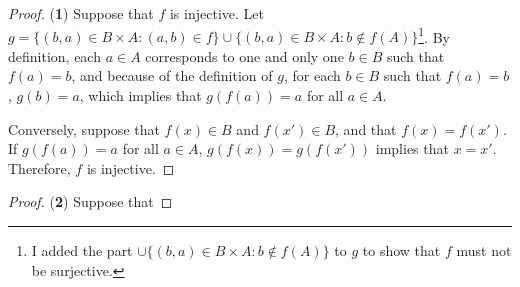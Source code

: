 \begin{proof}(\textbf{1})
	Suppose that $f$ is injective. Let $g = \{(b,a)\in B\times A:(a,b)\in f\}\cup\{(b,a)\in B\times A:b\notin f(A)\}$\footnote{I added the part $\cup\{(b,a)\in B\times A:b\notin f(A)\}$ to $g$ to show that $f$ must not be surjective.}. By definition, each $a\in A$ corresponds to one and only one $b\in B$ such that $f(a)=b$, and because of the definition of $g$, for each $b\in B$ such that $f(a)=b$, $g(b)=a$, which implies that $g(f(a))=a$ for all $a\in A$. 
	
	Conversely, suppose that $f(x)\in B$ and $f(x')\in B$, and that $f(x)=f(x')$. If $g(f(a))=a$ for all $a\in A$, $g(f(x))=g(f(x'))$ implies that $x=x'$. Therefore, $f$ is injective.
\end{proof}

\begin{proof}(\textbf{2})
	Suppose that 
\end{proof}





























